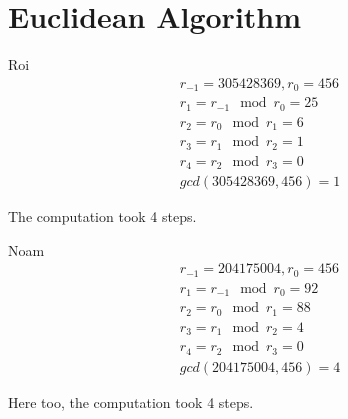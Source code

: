 \documentclass{article}
\begin{document}
\section{Euclidean Algorithm}

\begin{paragraph}
	{Roi}\
	\begin{gather*}
		r_{-1} = 305428369, r_0 = 456\\
		r_1 = r_{-1} \mod{r_0} = 25\\
		r_2 = r_0 \mod{r_1} = 6\\
		r_3 = r_1 \mod{r_2} = 1\\
		r_4 = r_2 \mod{r_3} = 0\\
		gcd(305428369, 456) = 1
	\end{gather*}

	The computation took 4 steps.
\end{paragraph}

\begin{paragraph}
	{Noam}\
	\begin{gather*}
		r_{-1} = 204175004, r_0 = 456\\
		r_1 = r_{-1} \mod {r_0} = 92\\
		r_2 = r_0 \mod {r_1} = 88\\
		r_3 = r_1 \mod {r_2} = 4\\
		r_4 = r_2 \mod {r_3} = 0\\
		gcd(204175004, 456) = 4
	\end{gather*}

	Here too, the computation took 4 steps.
\end{paragraph}
\end{document}
